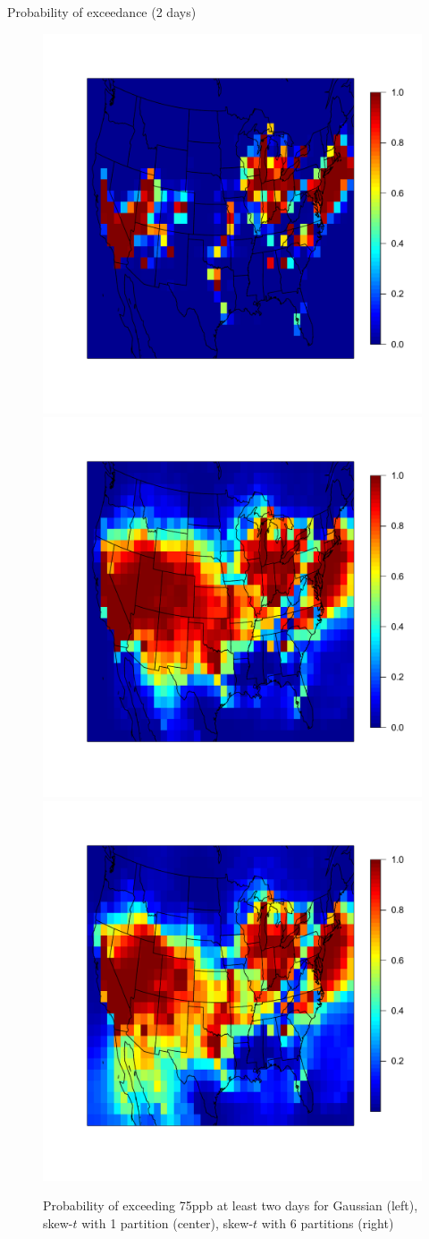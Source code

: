 \documentclass{beamer}
\begin{document}
\begin{frame}{Probability of exceedance (2 days)}
  \centering
  \begin{figure}
    \includegraphics[width=0.33\linewidth, trim=0.2in 0 0.2in 1in]{./plots/pot/ozone-p2-gaus.pdf}
    \includegraphics[width=0.33\linewidth, trim=0.2in 0 0.2in 1in]{./plots/pot/ozone-p2-t1.pdf}
    \includegraphics[width=0.33\linewidth, trim=0.2in 0 0.2in 1in]{./plots/pot/ozone-p2-t6.pdf}
    \caption{Probability of exceeding 75ppb at least two days for Gaussian (left), skew-$t$ with 1 partition (center), skew-$t$ with 6 partitions (right)}
  \end{figure}
\end{frame}
\end{document}
